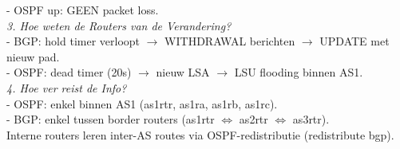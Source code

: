    - OSPF up: GEEN packet loss.\\
 
\textit{3. Hoe weten de Routers van de Verandering?}\\

   - BGP: hold timer verloopt $\rightarrow$ WITHDRAWAL berichten $\rightarrow$ UPDATE met nieuw pad.\\
   - OSPF: dead timer (20s) $\rightarrow$ nieuw LSA $\rightarrow$ LSU flooding binnen AS1.\\
 
\textit{4. Hoe ver reist de Info?}\\

   - OSPF: enkel binnen AS1 (as1rtr, as1ra, as1rb, as1rc).\\
   - BGP: enkel tussen border routers (as1rtr $\Leftrightarrow$ as2rtr $\Leftrightarrow$ as3rtr).\\
   
     Interne routers leren inter-AS routes via OSPF-redistributie (redistribute bgp).\\
     